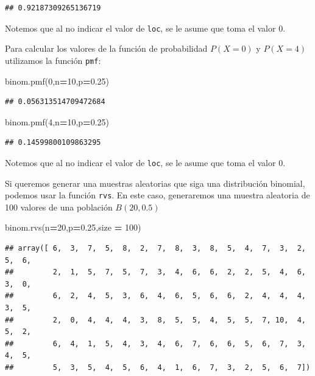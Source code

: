 \documentclass[]{book}
\newenvironment{Shaded}{\begin{snugshade}}{\end{snugshade}}
\newcommand{\DecValTok}[1]{\textcolor[rgb]{0.00,0.00,0.81}{#1}}
\newcommand{\FloatTok}[1]{\textcolor[rgb]{0.00,0.00,0.81}{#1}}
\newcommand{\NormalTok}[1]{#1}
\newcommand{\OperatorTok}[1]{\textcolor[rgb]{0.81,0.36,0.00}{\textbf{#1}}}
\begin{document}
\begin{verbatim}
## 0.92187309265136719
\end{verbatim}

Notemos que al no indicar el valor de \texttt{loc}, se le asume que toma el valor 0.

Para calcular los valores de la función de probabilidad \(P(X=0)\) y \(P(X=4)\) utilizamos la función \texttt{pmf}:

\begin{Shaded}
\begin{Highlighting}[]
\NormalTok{binom.pmf(}\DecValTok{0}\NormalTok{,n}\OperatorTok{=}\DecValTok{10}\NormalTok{,p}\OperatorTok{=}\FloatTok{0.25}\NormalTok{)}
\end{Highlighting}
\end{Shaded}

\begin{verbatim}
## 0.056313514709472684
\end{verbatim}

\begin{Shaded}
\begin{Highlighting}[]
\NormalTok{binom.pmf(}\DecValTok{4}\NormalTok{,n}\OperatorTok{=}\DecValTok{10}\NormalTok{,p}\OperatorTok{=}\FloatTok{0.25}\NormalTok{)}
\end{Highlighting}
\end{Shaded}

\begin{verbatim}
## 0.14599800109863295
\end{verbatim}

Notemos que al no indicar el valor de \texttt{loc}, se le asume que toma el valor 0.

Si queremos generar una muestras aleatorias que siga una distribución binomial, podemos usar la función \texttt{rvs}. En este caso, generaremos una muestra aleatoria de 100 valores de una población \(B(20,0.5)\)

\begin{Shaded}
\begin{Highlighting}[]
\NormalTok{binom.rvs(n}\OperatorTok{=}\DecValTok{20}\NormalTok{,p}\OperatorTok{=}\FloatTok{0.25}\NormalTok{,size }\OperatorTok{=} \DecValTok{100}\NormalTok{)}
\end{Highlighting}
\end{Shaded}

\begin{verbatim}
## array([ 6,  3,  7,  5,  8,  2,  7,  8,  3,  8,  5,  4,  7,  3,  2,  5,  6,
##         2,  1,  5,  7,  5,  7,  3,  4,  6,  6,  2,  2,  5,  4,  6,  3,  0,
##         6,  2,  4,  5,  3,  6,  4,  6,  5,  6,  6,  2,  4,  4,  4,  3,  5,
##         2,  0,  4,  4,  4,  3,  8,  5,  5,  4,  5,  5,  7, 10,  4,  5,  2,
##         6,  4,  1,  5,  4,  3,  4,  6,  7,  6,  6,  5,  6,  7,  3,  4,  5,
##         5,  3,  5,  4,  5,  6,  4,  1,  6,  7,  3,  2,  5,  6,  7])
\end{verbatim}
\end{document}
